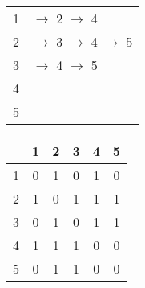 \documentclass{article}
\begin{document}
    \subsection{}
        \begin{figure}[H]
            \begin{minipage}{0.8\textwidth}
                \centering
                \captionsetup{labelformat=empty}
                \caption{Listas de Adjacência}
            \end{minipage}
            \centering
            \begin{subfigure}{0.30\textwidth}
                \begin{tabular}{l | l}
                    \Large 1 & \Large $\rightarrow$ 2 $\rightarrow$ 4\\
                    \Large 2 & \Large $\rightarrow$ 3 $\rightarrow$ 4 $\rightarrow$ 5\\
                    \Large 3 & \Large $\rightarrow$ 4 $\rightarrow$ 5\\
                    \Large 4 & \Large\\
                    \Large 5 & \Large\\
                \end{tabular}
            \end{subfigure}
        \end{figure}
        \begin{figure}[H]
            \begin{minipage}{0.8\textwidth}
                \centering
                \captionsetup{labelformat=empty}
                \caption{Matriz de Adjacência}
            \end{minipage}
            \centering
            \begin{subfigure}{0.30\textwidth}
                \begin{tabular}{c|ccccc}
                      & 1 & 2 & 3 & 4 & 5 \\
                \hline
                    1 & 0 & 1 & 0 & 1 & 0 \\
                    2 & 1 & 0 & 1 & 1 & 1 \\
                    3 & 0 & 1 & 0 & 1 & 1 \\
                    4 & 1 & 1 & 1 & 0 & 0 \\
                    5 & 0 & 1 & 1 & 0 & 0 \\
                \end{tabular}
            \end{subfigure}
        \end{figure}    
\end{document}
